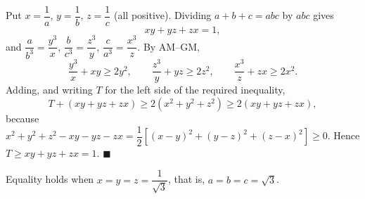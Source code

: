 Put $x=\dfrac{1}{a}$, $y=\dfrac{1}{b}$, $z=\dfrac{1}{c}$ (all positive). Dividing $a+b+c=abc$ by $abc$ gives
\[
xy+yz+zx=1,
\]
and $\dfrac{a}{b^3}=\dfrac{y^3}{x}$, $\dfrac{b}{c^3}=\dfrac{z^3}{y}$, $\dfrac{c}{a^3}=\dfrac{x^3}{z}$. By AM--GM,
\[
\dfrac{y^3}{x}+xy\ge2y^2,\qquad \dfrac{z^3}{y}+yz\ge2z^2,\qquad \dfrac{x^3}{z}+zx\ge2x^2 .
\]
Adding, and writing $T$ for the left side of the required inequality,
\[
T+(xy+yz+zx)\ge2(x^2+y^2+z^2)\ge2(xy+yz+zx),
\]
because $x^2+y^2+z^2-xy-yz-zx=\dfrac{1}{2}\left[(x-y)^2+(y-z)^2+(z-x)^2\right]\ge0$. Hence $T\ge xy+yz+zx=1$. $\blacksquare$

Equality holds when $x=y=z=\dfrac{1}{\sqrt3}$, that is, $a=b=c=\sqrt3$.

